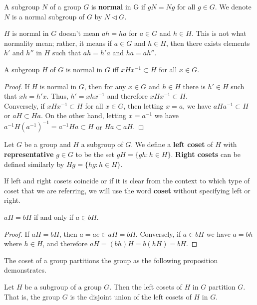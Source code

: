 \begin{definition}
A subgroup $N$ of a group $G$ is \textbf{normal} in G if $gN =Ng$ for all $g \in G$. We denote $N$ is a normal subgroup of $G$ by $N\lhd G$.
\end{definition}

\begin{remark}
$H$ is normal in $G$ doesn't mean $ah=ha$ for $a\in G$ and $h\in H$. This is not what normality mean; rather, it means if $a\in G$ and $h\in H$, then there exists elements $h'$ and $h''$ in $H$ such that $ah=h'a$ and $ha=ah''$.
\end{remark}
\begin{proposition}
A subgroup $H$ of $G$ is normal in $G$ iff $xHx^{-1}\subset H$ for all $x\in G$.
\end{proposition}
\begin{proof}
If $H$ is normal in $G$, then for any $x\in G$ and $h\in H$ there is $h'\in H$ such that $xh=h'x.$ Thus, $h'=xhx^{-1}$ and therefore $xHx^{-1}\subset H$.\\
Conversely, if $xHx^{-1}\subset H$ for all $x\in G$, then letting $x=a$, we have $aHa^{-1}\subset H$ or $aH\subset Ha$. On the other hand, letting $x=a^{-1}$ we have $a^{-1}H(a^{-1})^{-1}=a^{-1}Ha\subset H$ or $Ha\subset aH.$
\end{proof}
\begin{definition}
Let $G$ be a group and $H$ a subgroup of $G$.  We define a \textbf{left  coset} of $H$ with \textbf{representative} $g \in G$ to be the set $gH = \{ gh : h \in H \}.$ \textbf{Right cosets} can be defined similarly by $Hg = \{ hg : h \in H \}.$
\end{definition}
If left and right cosets coincide or if it is clear from the context to which type of coset that we are referring, we will use the word \textbf{coset} without specifying left or right.
\begin{lemma}\label{coslemma}
 $aH = bH$ if and only if $a \in bH$.
\end{lemma}
\begin{proof}
 If $aH=bH$, then $a = ae \in aH=bH$. Conversely, if $a \in bH$ we have $a = bh$ where $h \in H$, and therefore $aH = (bh)H = b(hH) = bH$.
\end{proof}

The coset of a group partitions the group as the following proposition demonstrates.
\newpage
\begin{proposition}
Let $H$ be a subgroup of a group $G$.  Then the left cosets of $H$ in $G$ partition $G$.  That is, the group $G$ is the disjoint union of the left cosets of $H$ in $G$.
\end{proposition}

